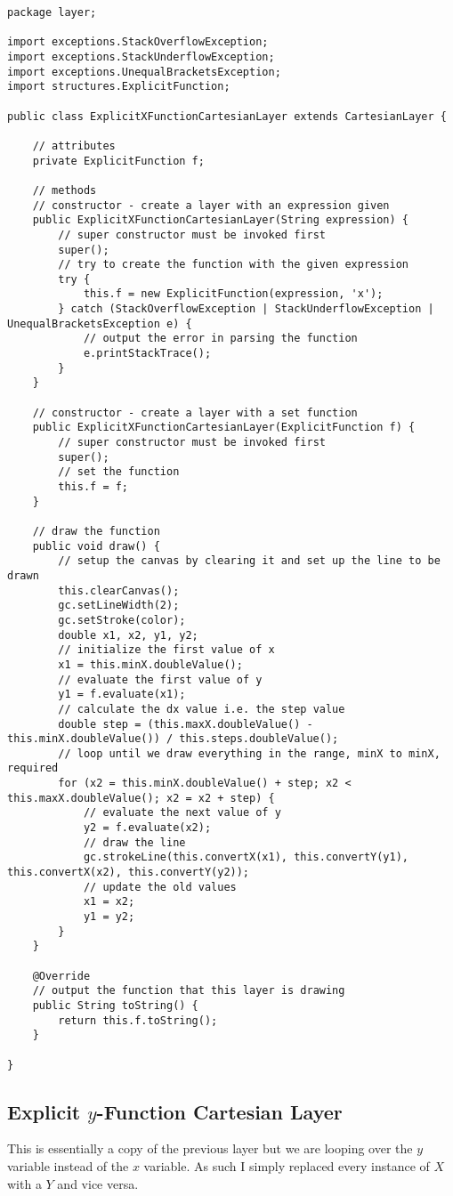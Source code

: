 \documentclass[../../../../main.tex]{subfiles}
\begin{document}
\begin{verbatim}
package layer;

import exceptions.StackOverflowException;
import exceptions.StackUnderflowException;
import exceptions.UnequalBracketsException;
import structures.ExplicitFunction;

public class ExplicitXFunctionCartesianLayer extends CartesianLayer {

	// attributes
	private ExplicitFunction f;

	// methods
	// constructor - create a layer with an expression given
	public ExplicitXFunctionCartesianLayer(String expression) {
		// super constructor must be invoked first
		super();
		// try to create the function with the given expression
		try {
			this.f = new ExplicitFunction(expression, 'x');
		} catch (StackOverflowException | StackUnderflowException | UnequalBracketsException e) {
			// output the error in parsing the function
			e.printStackTrace();
		}
	}

	// constructor - create a layer with a set function
	public ExplicitXFunctionCartesianLayer(ExplicitFunction f) {
		// super constructor must be invoked first
		super();
		// set the function
		this.f = f;
	}

	// draw the function
	public void draw() {
		// setup the canvas by clearing it and set up the line to be drawn
		this.clearCanvas();
		gc.setLineWidth(2);
		gc.setStroke(color);
		double x1, x2, y1, y2;
		// initialize the first value of x
		x1 = this.minX.doubleValue();
		// evaluate the first value of y
		y1 = f.evaluate(x1);
		// calculate the dx value i.e. the step value
		double step = (this.maxX.doubleValue() - this.minX.doubleValue()) / this.steps.doubleValue();
		// loop until we draw everything in the range, minX to minX, required
		for (x2 = this.minX.doubleValue() + step; x2 < this.maxX.doubleValue(); x2 = x2 + step) {
			// evaluate the next value of y
			y2 = f.evaluate(x2);
			// draw the line
			gc.strokeLine(this.convertX(x1), this.convertY(y1), this.convertX(x2), this.convertY(y2));
			// update the old values
			x1 = x2;
			y1 = y2;
		}
	}

	@Override
	// output the function that this layer is drawing
	public String toString() {
		return this.f.toString();
	}

}
\end{verbatim}
\subsection{Explicit $y$-Function Cartesian Layer}
This is essentially a copy of the previous layer but we are looping over the $y$ variable instead of the $x$ variable. As such I simply replaced every instance of $X$ with a $Y$ and vice versa.
\end{document}
